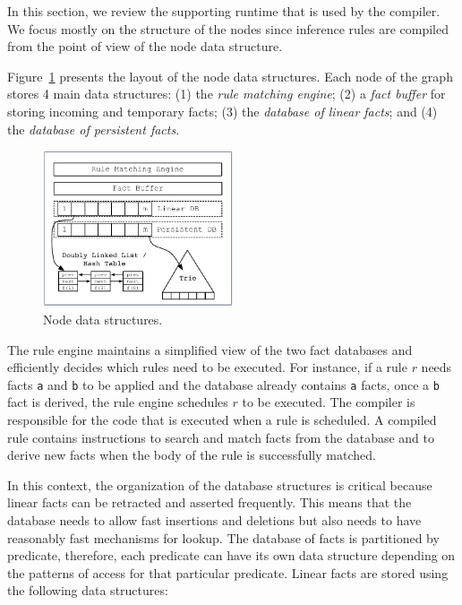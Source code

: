 In this section, we review the supporting runtime that is used by the compiler.
We focus mostly on the structure of the nodes since inference rules are compiled
from the point of view of the node data structure.

Figure~\ref{fig:node} presents the layout of the node data structures.  Each
node of the graph stores 4 main data structures: (1) the \emph{rule matching
   engine}; (2) a \emph{fact buffer} for storing incoming and temporary facts;
(3) the \emph{database of linear facts}; and (4) the \emph{database of
   persistent facts}.

\begin{figure}
\vspace{-1.2cm}
\begin{center}
   \includegraphics[width=0.5\textwidth]{figures/overview.pdf}
\end{center}
\caption{Node data structures.}
\label{fig:node}
\vspace{-0.7cm}
\end{figure}

The rule engine maintains a simplified view of the two fact databases and
efficiently decides which rules need to be executed. For instance, if a rule $r$
needs facts \texttt{a} and \texttt{b} to be applied and the database already
contains \texttt{a} facts, once a \texttt{b} fact is derived, the rule engine
schedules $r$ to be executed. The compiler is responsible for the code that is
executed when a rule is scheduled.  A compiled rule contains instructions to
search and match facts from the database and to derive new facts when the body
of the rule is successfully matched.

In this context, the organization of the database structures is critical because
linear facts can be retracted and asserted frequently. This means that the
database needs to allow fast insertions and deletions but also needs to have
reasonably fast mechanisms for lookup. The database of facts is partitioned by
predicate, therefore, each predicate can have its own data structure depending
on the patterns of access for that particular predicate. Linear facts are stored
using the following data structures:



